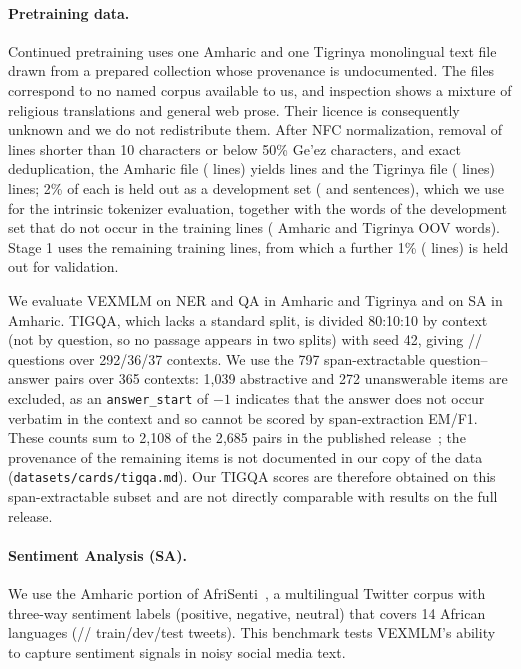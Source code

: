 \paragraph{Pretraining data.} Continued pretraining uses one Amharic and one Tigrinya monolingual text file drawn from a prepared collection whose provenance is undocumented. The files correspond to no named corpus available to us, and inspection shows a mixture of religious translations and general web prose. Their licence is consequently unknown and we do not redistribute them. After NFC normalization, removal of lines shorter than 10 characters or below 50\% Ge'ez characters, and exact deduplication, the Amharic file (\corpusAmhRaw{} lines) yields \corpusAmhKept{} lines and the Tigrinya file (\corpusTirRaw{} lines) \corpusTirKept{} lines; 2\% of each is held out as a development set (\corpusAmhDev{} and \corpusTirDev{} sentences), which we use for the intrinsic tokenizer evaluation, together with the words of the development set that do not occur in the training lines (\corpusAmhOOVWords{} Amharic and \corpusTirOOVWords{} Tigrinya OOV words). Stage 1 uses the remaining training lines, from which a further 1\% (\ptValLines{} lines) is held out for validation.

We evaluate VEXMLM on NER and QA in Amharic and Tigrinya and on SA in Amharic. TIGQA, which lacks a standard split, is divided 80:10:10 by context (not by question, so no passage appears in two splits) with seed 42, giving \splitTigQATrain{}/\splitTigQAValidation{}/\splitTigQATest{} questions over 292/36/37 contexts. We use the 797 span-extractable question--answer pairs over 365 contexts: 1{,}039 abstractive and 272 unanswerable items are excluded, as an \texttt{answer\_start} of $-1$ indicates that the answer does not occur verbatim in the context and so cannot be scored by span-extraction EM/F1. These counts sum to 2{,}108 of the 2{,}685 pairs in the published release~\cite{teklehaymanot2024tigqa}; the provenance of the remaining items is not documented in our copy of the data (\texttt{datasets/cards/tigqa.md}). Our TIGQA scores are therefore obtained on this span-extractable subset and are not directly comparable with results on the full release.

\paragraph{Sentiment Analysis (SA).} We use the Amharic portion of AfriSenti~\cite{muhammad2023afrisenti}, a multilingual Twitter corpus with three-way sentiment labels (positive, negative, neutral) that covers 14 African languages (\splitSATrain{}/\splitSAValidation{}/\splitSATest{} train/dev/test tweets). This benchmark tests VEXMLM's ability to capture sentiment signals in noisy social media text.

